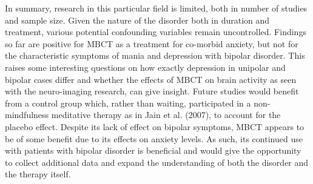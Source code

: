 In summary, research in this particular field is limited, both in number of studies and sample size. Given the nature of the disorder both in duration and treatment, various potential confounding variables remain uncontrolled. Findings so far are positive for MBCT as a treatment for co-morbid anxiety, but not for the characteristic symptoms of mania and depression with bipolar disorder. This raises some interesting questions on how exactly depression in unipolar and bipolar cases differ and whether the effects of MBCT on brain activity as seen with the neuro-imaging research, can give insight. Future studies would benefit from a control group which, rather than waiting, participated in a non-mindfulness meditative therapy as in Jain et al. (2007), to account for the placebo effect. Despite its lack of effect on bipolar symptoms, MBCT appears to be of some benefit due to its effects on anxiety levels. As such, its continued use with patients with bipolar disorder is beneficial and would give the opportunity to collect additional data and expand the understanding of both the disorder and the therapy itself.